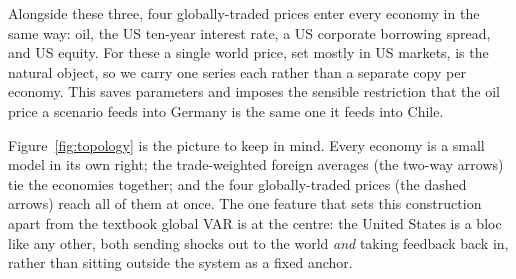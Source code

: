 \documentclass[11pt]{article}
\begin{document}
Alongside these three, four globally-traded prices enter every economy in the same way: oil, the US
ten-year interest rate, a US corporate borrowing spread, and US equity. For these a single world price,
set mostly in US markets, is the natural object, so we carry one series each rather than a separate copy
per economy. This saves parameters and imposes the sensible restriction that the oil price a scenario
feeds into Germany is the same one it feeds into Chile.

Figure~\ref{fig:topology} is the picture to keep in mind. Every economy is a small model in its own right;
the trade-weighted foreign averages (the two-way arrows) tie the economies together; and the four
globally-traded prices (the dashed arrows) reach all of them at once. The one feature that sets this
construction apart from the textbook global VAR is at the centre: the United States is a bloc like any
other, both sending shocks out to the world \emph{and} taking feedback back in, rather than sitting
outside the system as a fixed anchor.
\end{document}

